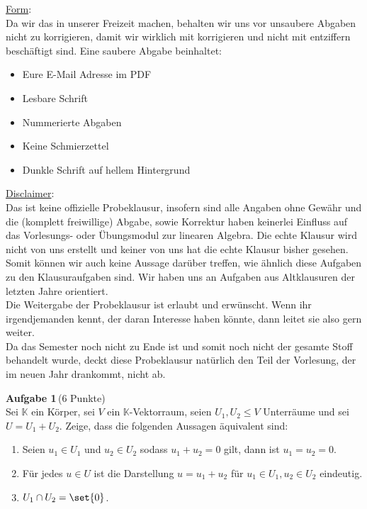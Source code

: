 \documentclass[11pt]{report} %
\newcommand\bK{\mathbb{K}}
\begin{document}
	\medskip\noindent
	\underline{Form}:\\
		Da wir das in unserer Freizeit machen, behalten wir uns vor unsaubere Abgaben nicht zu korrigieren, damit wir wirklich mit korrigieren und nicht mit entziffern beschäftigt sind. 
        Eine saubere Abgabe beinhaltet:
        \begin{itemize}[noitemsep]
	        \item Eure E-Mail Adresse im PDF
	        \item Lesbare Schrift
	        \item Nummerierte Abgaben
	        \item Keine Schmierzettel
	        \item Dunkle Schrift auf hellem Hintergrund
        \end{itemize}


	
	\medskip\noindent
	\underline{Disclaimer}:\\
		Das ist keine offizielle Probeklausur, insofern sind alle Angaben ohne Gewähr und die (komplett freiwillige) Abgabe, sowie Korrektur haben keinerlei Einfluss auf das Vorlesungs- oder Übungsmodul zur linearen Algebra. Die echte Klausur wird nicht von uns erstellt und keiner von uns hat die echte Klausur bisher gesehen. Somit können wir auch keine Aussage darüber treffen, wie ähnlich diese Aufgaben zu den Klausuraufgaben sind. Wir haben uns an Aufgaben aus Altklausuren der letzten Jahre orientiert.\\
		Die Weitergabe der Probeklausur ist erlaubt und erwünscht. Wenn ihr irgendjemanden kennt, der daran Interesse haben könnte, dann leitet sie also gern weiter.\\
		Da das Semester noch nicht zu Ende ist und somit noch nicht der gesamte Stoff behandelt wurde, deckt diese Probeklausur natürlich den Teil der Vorlesung, der im neuen Jahr drankommt, nicht ab. 
	
	\pagebreak\noindent
	{\bf Aufgabe 1}\,(6 Punkte)\\
		Sei $\bK$ ein Körper, sei $V$ ein $\bK$-Vektorraum, seien $U_1, U_2 \leq V$ Unterräume und sei $U = U_1 + U_2$. Zeige, dass die folgenden Aussagen äquivalent sind:
		\begin{enumerate}
			\item 
				Seien $u_1 \in U_1$ und $u_2 \in U_2$ sodass $u_1 + u_2 = 0$ gilt, dann ist $u_1 = u_2 = 0$.
				
			\item 
				Für jedes $u \in U$ ist die Darstellung $u = u_1 + u_2$ für $u_1 \in U_1, u_2 \in U_2$ eindeutig.
				
			\item 
				$U_1 \cap U_2 = \set{0}$.
		\end{enumerate}
		
\end{document}
